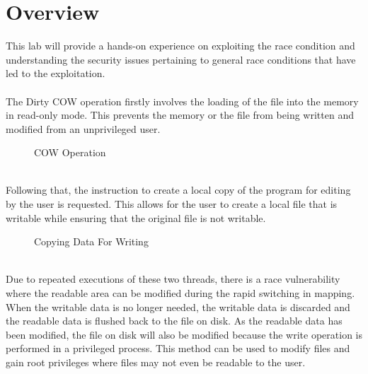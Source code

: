 \documentclass[a4paper,12pt]{article}
\begin{document}
\section{Overview}
This lab will provide a hands-on experience on exploiting the race condition and understanding the security issues pertaining to general race conditions that have led to the exploitation.
\\\\
The Dirty COW operation firstly involves the loading of the file into the memory in read-only mode. This prevents the memory or the file from being written and modified from an unprivileged user.
	\begin{figure}[!h]
	\centering
{}
		\caption{COW Operation}
\end{figure}\\
Following that, the instruction to create a local copy of the program for editing by the user is requested. This allows for the user to create a local file that is writable while ensuring that the original file is not writable.
	\begin{figure}[!h]
	\centering
	\caption{Copying Data For Writing}
\end{figure}
\\Due to repeated executions of these two threads, there is a race vulnerability where the readable area can be modified during the rapid switching in mapping. When the writable data is no longer needed, the writable data is discarded and the readable data is flushed back to the file on disk. As the readable data has been modified, the file on disk will also be modified because the write operation is performed in a privileged process. This method can be used to modify files and gain root privileges where files may not even be readable to the user.
\end{document}
